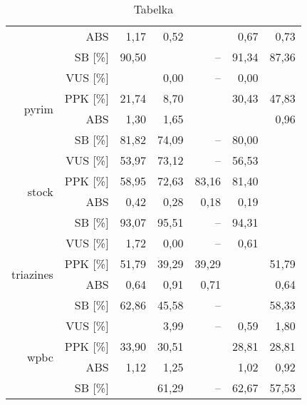 \documentclass[10pt,a4paper]{article}
\begin{document}
\begin{table}[ht]
\begin{tabular}{rrrrrrr}
   & ABS & 1,17 & 0,52 & \color{red}{0,51} & 0,67 & 0,73 \\ 
   & SB [\%] & 90,50 & \color{red}{92,87} & -- & 91,34 & 87,36 \\ 
   \hline
\multirow{4}{15mm}{pyrim} & VUS [\%] & \color{red}{0,74} & 0,00 & -- & 0,00 & \color{red}{0,74} \\ 
   & PPK [\%] & 21,74 & 8,70 & \color{red}{52,17} & 30,43 & 47,83 \\ 
   & ABS & 1,30 & 1,65 & \color{red}{0,91} & \color{red}{0,91} & 0,96 \\ 
   & SB [\%] & 81,82 & 74,09 & -- & 80,00 & \color{red}{82,73} \\ 
   \hline
\multirow{4}{15mm}{stock} & VUS [\%] & 53,97 & 73,12 & -- & 56,53 & \color{red}{96,01} \\ 
   & PPK [\%] & 58,95 & 72,63 & 83,16 & 81,40 & \color{red}{91,58} \\ 
   & ABS & 0,42 & 0,28 & 0,18 & 0,19 & \color{red}{0,08} \\ 
   & SB [\%] & 93,07 & 95,51 & -- & 94,31 & \color{red}{99,42} \\ 
   \hline
\multirow{4}{15mm}{triazines} & VUS [\%] & 1,72 & 0,00 & -- & 0,61 & \color{red}{1,83} \\ 
   & PPK [\%] & 51,79 & 39,29 & 39,29 & \color{red}{53,57} & 51,79 \\ 
   & ABS & 0,64 & 0,91 & 0,71 & \color{red}{0,61} & 0,64 \\ 
   & SB [\%] & 62,86 & 45,58 & -- & \color{red}{66,46} & 58,33 \\ 
   \hline
\multirow{4}{15mm}{wpbc} & VUS [\%] & \color{red}{4,44} & 3,99 & -- & 0,59 & 1,80 \\ 
   & PPK [\%] & 33,90 & 30,51 & \color{red}{35,59} & 28,81 & 28,81 \\ 
   & ABS & 1,12 & 1,25 & \color{red}{0,86} & 1,02 & 0,92 \\ 
   & SB [\%] & \color{red}{67,59} & 61,29 & -- & 62,67 & 57,53 \\ 
   \hline
\end{tabular}
\caption{Tabelka} 
\end{table}
\end{document}
